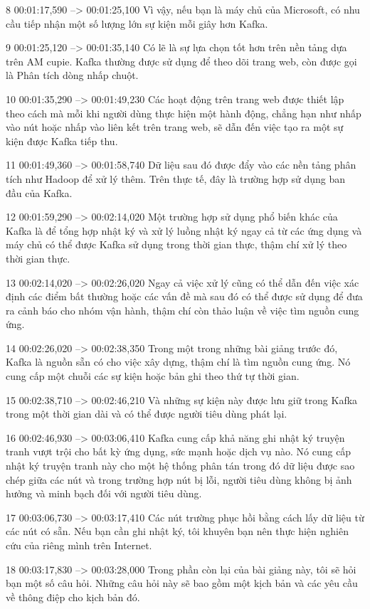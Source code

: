 8
00:01:17,590 --> 00:01:25,100
Vì vậy, nếu bạn là máy chủ của Microsoft, có nhu cầu tiếp nhận một số lượng lớn sự kiện mỗi giây hơn Kafka.

9
00:01:25,120 --> 00:01:35,140
Có lẽ là sự lựa chọn tốt hơn trên nền tảng dựa trên AM cupie.  Kafka thường được sử dụng để theo dõi trang web, còn được gọi là Phân tích dòng nhấp chuột.

10
00:01:35,290 --> 00:01:49,230
Các hoạt động trên trang web được thiết lập theo cách mà mỗi khi người dùng thực hiện một hành động, chẳng hạn như nhấp vào nút hoặc nhấp vào liên kết trên trang web, sẽ dẫn đến việc tạo ra một sự kiện được Kafka tiếp thu.

11
00:01:49,360 --> 00:01:58,740
Dữ liệu sau đó được đẩy vào các nền tảng phân tích như Hadoop để xử lý thêm.  Trên thực tế, đây là trường hợp sử dụng ban đầu của Kafka.

12
00:01:59,290 --> 00:02:14,020
Một trường hợp sử dụng phổ biến khác của Kafka là để tổng hợp nhật ký và xử lý luồng nhật ký ngay cả từ các ứng dụng và máy chủ có thể được Kafka sử dụng trong thời gian thực, thậm chí xử lý theo thời gian thực.

13
00:02:14,020 --> 00:02:26,020
Ngay cả việc xử lý cũng có thể dẫn đến việc xác định các điểm bất thường hoặc các vấn đề mà sau đó có thể được sử dụng để đưa ra cảnh báo cho nhóm vận hành, thậm chí còn thảo luận về việc tìm nguồn cung ứng.

14
00:02:26,020 --> 00:02:38,350
Trong một trong những bài giảng trước đó, Kafka là nguồn sẵn có cho việc xây dựng, thậm chí là tìm nguồn cung ứng.  Nó cung cấp một chuỗi các sự kiện hoặc bản ghi theo thứ tự thời gian.

15
00:02:38,710 --> 00:02:46,210
Và những sự kiện này được lưu giữ trong Kafka trong một thời gian dài và có thể được người tiêu dùng phát lại.

16
00:02:46,930 --> 00:03:06,410
Kafka cung cấp khả năng ghi nhật ký truyện tranh vượt trội cho bất kỳ ứng dụng, sức mạnh hoặc dịch vụ nào.  Nó cung cấp nhật ký truyện tranh này cho một hệ thống phân tán trong đó dữ liệu được sao chép giữa các nút và trong trường hợp nút bị lỗi, người tiêu dùng không bị ảnh hưởng và minh bạch đối với người tiêu dùng.

17
00:03:06,730 --> 00:03:17,410
Các nút trường phục hồi bằng cách lấy dữ liệu từ các nút có sẵn.  Nếu bạn cần ghi nhật ký, tôi khuyên bạn nên thực hiện nghiên cứu của riêng mình trên Internet.

18
00:03:17,830 --> 00:03:28,000
Trong phần còn lại của bài giảng này, tôi sẽ hỏi bạn một số câu hỏi.  Những câu hỏi này sẽ bao gồm một kịch bản và các yêu cầu về thông điệp cho kịch bản đó.

